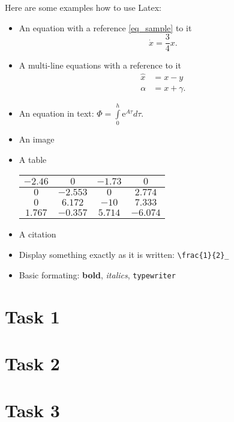 \documentclass[a4paper,12pt,oneside,onecolumn]{article} %
\begin{document}
Here are some examples how to use Latex:
\begin{itemize}
 \item An equation with a reference \eqref{eq_sample} to it
 \begin{equation}
  \dot{x} = \frac{3}{4} x. \label{eq_sample}
 \end{equation}
 \item A multi-line equations with a reference to it
 \begin{align*}
  \hat{x} &= x - y\\
  \alpha &= x + \gamma.
 \end{align*}
 \item An equation in text: $\Phi = \int\limits_{0}^{h} \mathrm{e}^{A\tau} d \tau$.
 \item An image
 \item A table

 \begin{tabular}{@{\vrule height 10.5pt depth4pt  width0pt}|c|c|c|c|}
    \hline
     $-2.46$ & $0$ & $-1.73$ & $0$ \\ \hline
     $0$ & $-2.553$ & $0$ & $2.774$ \\ \hline
     $0$ & $6.172$ & $-10$ & $7.333$ \\ \hline
     $1.767$ & $-0.357$ & $5.714$ & $-6.074$ \\ \hline
  \end{tabular}
  \item A citation \cite{Oetiker:2008:TheNotSoShortIntroductiontoLaTeXe}
  \item Display something exactly as it is written: \verb|\frac{1}{2}_|
  \item Basic formating: \textbf{bold}, \textit{italics}, \texttt{typewriter}
\end{itemize}



\section*{Task 1}


\section*{Task 2}
%

\section*{Task 3}
%
\end{document}
